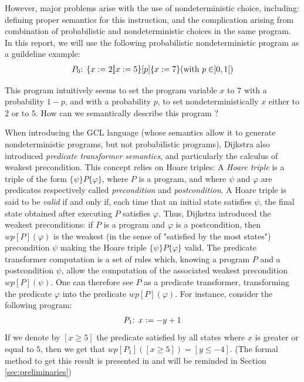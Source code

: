 \documentclass[a4paper,10pt]{llncs}
\begin{document}
However, major problems arise with the use of nondeterministic choice, including: defining proper semantics for this instruction, and the complication arising from combination of probabilistic and nondeterministic choices in the same program. In this report, we will use the following probabilistic nondeterministic program as a guildeline example:
\begin{align*}
 P_0\textnormal{: } \{ x := 2 [\!] x := 5 \} [p] \{ x := 7 \} \textnormal{(with } p \in ]0,1[\textnormal{)}
\end{align*}

This program intuitively seems to set the program variable $x$ to $7$ with a probability $1-p$, and with a probability $p$, to set nondeterministically $x$ either to $2$ or to $5$. How can we semantically describe this program ?\bigskip

When introducing the GCL language \cite{Dijkstra76} (whose semantics allow it to generate nondeterministic programs, but not probabilistic programs), Dijkstra also introduced \emph{predicate transformer semantics}, and particularly the calculus of weakest precondition. This concept relies on Hoare triples: A \emph{Hoare triple} is a triple of the form $\{\psi\}P\{\varphi\}$, where $P$ is a program, and where $\psi$ and $\varphi$ are predicates respectively called \emph{precondition} and \emph{postcondition}. A Hoare triple is said to be \emph{valid} if and only if, each time that an initial state satisfies $\psi$, the final state obtained after executing $P$ satisfies $\varphi$. Thus, Dijkstra introduced the weakest preconditions: if $P$ is a program and $\varphi$ is a postcondition, then $wp[P](\varphi)$ is the weakest (in the sense of "satisfied by the most states") precondition $\psi$ making the Hoare triple $\{\psi\}P\{\varphi\}$ valid. The predicate transformer computation is a set of rules which, knowing a program $P$ and a postcondition $\psi$, allow the computation of the associated weakest precondition $wp[P](\psi)$. One can therefore see $P$ as a predicate transformer, transforming the predicate $\varphi$ into the predicate $wp[P](\varphi)$.\newline
For instance, consider the following program:
\begin{align*}
 P_1\textnormal{: } x := -y+1
\end{align*}
If we denote by $[x \geq 5]$ the predicate satisfied by all states where $x$ is greater or equal to $5$, then we get that $wp[P_1]([x \geq 5]) = [y \leq -4]$. (The formal method to get this result is presented in \cite{Dijkstra76} and will be reminded in Section \ref{sec:preliminaries})\bigskip
\end{document}
